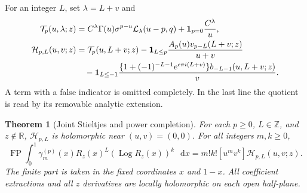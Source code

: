 \documentclass[11pt,a4paper]{article}
\numberwithin{equation}{section}
\newtheorem{theorem}{Theorem}[section]
\theoremstyle{definition}
\theoremstyle{remark}
\DeclareMathOperator{\Log}{Log}
\DeclareMathOperator{\FP}{FP}
\newcommand{\dd}{\mathop{}\!\mathrm{d}}
\begin{document}
For an integer $L$, set $\lambda=L+v$ and
\begin{align}
 \mathcal T_p(u,\lambda;z)
   &=C^\lambda\Gamma(u)\sigma^{p-u}
                    \mathcal L_\lambda(u-p,q)
         +\mathbf1_{p=0}\frac{C^\lambda}{u},\label{power:T}\\
 \mathcal H_{p,L}(u,v;z)
   &=\mathcal T_p(u,L+v;z)
      -\mathbf1_{L\le p}
        \frac{A_p(u)v_{p-L}(L+v;z)}{u+v}\notag\\
   &\quad-\mathbf1_{L\le-1}
       \frac{\{1+(-1)^{-L-1}e^{\epsilon\pi i(L+v)}\}
                    b_{-L-1}(u,L+v;z)}{v}.
       \label{power:H}
\end{align}
A term with a false indicator is omitted completely.  In the last
line the quotient is read by its removable analytic extension.

\begin{theorem}[Joint Stieltjes and power completion]\label{power:completion}
For each $p\ge0$, $L\in\mathbb Z$, and $z\notin\mathbb R$,
$\mathcal H_{p,L}$ is holomorphic near $(u,v)=(0,0)$.
For all integers $m,k\ge0$,
\begin{equation}\label{power:allmoments}
 \boxed{\displaystyle
 \FP\int_0^1\gamma_m^{(p)}(x)R_z(x)^L
                    (\Log R_z(x))^k\,\dd x
       =m!k![u^mv^k]\mathcal H_{p,L}(u,v;z).}
\end{equation}
The finite part is taken in the fixed coordinates $x$ and $1-x$.
All coefficient extractions and all $z$ derivatives are locally
holomorphic on each open half-plane.
\end{theorem}
\end{document}
